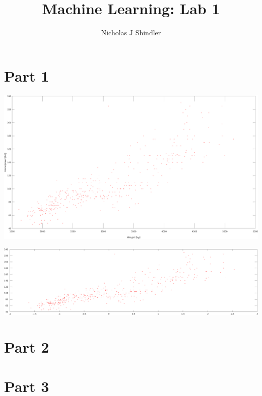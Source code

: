\documentclass[10pt,a4paper,]{report}
\author{Nicholas J Shindler}
\title{Machine Learning: Lab 1}
\begin{document}
\maketitle
\tableofcontents

\section*{Part 1}



\includegraphics[width=\textwidth]{part1a_hp_v_kg.png}



\includegraphics[width=\textwidth]{part1_normalized.png}

\section*{Part 2}


\section*{Part 3}


\end{document}
